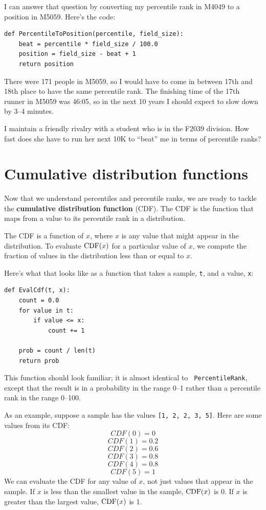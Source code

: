 \documentclass[12pt]{book}
\begin{document}
I can answer that question by converting my percentile rank in M4049
to a position in M5059.  Here's the code:

\begin{verbatim}
def PercentileToPosition(percentile, field_size):
    beat = percentile * field_size / 100.0
    position = field_size - beat + 1
    return position
\end{verbatim}

There were 171 people in M5059, so I would have to come in between
17th and 18th place to have the same percentile rank.  The finishing
time of the 17th runner in M5059 was 46:05, so in the next 10 years I
should expect to slow down by 3--4 minutes.

I maintain a friendly rivalry with a student who is in the
F2039 division.  How fast does she have to run her next 10K to
``beat'' me in terms of percentile ranks?


\section{Cumulative distribution functions}

Now that we understand percentiles and percentile ranks,
we are ready to tackle the {\bf cumulative distribution function}
(CDF).  The CDF is the function that maps from a value to its
percentile rank in a distribution.

The CDF is a function of $x$, where $x$ is any value that might appear
in the distribution.  To evaluate $\mathrm{CDF}(x)$ for a particular value of
$x$, we compute the fraction of values in the distribution less
than or equal to $x$.

Here's what that looks like as a function that takes a sample,
{\tt t}, and a value, {\tt x}:
%
\begin{verbatim}
def EvalCdf(t, x):
    count = 0.0
    for value in t:
        if value <= x:
            count += 1

    prob = count / len(t)
    return prob
\end{verbatim}

This function should look familiar; it is almost identical to {\tt
  PercentileRank}, except that the result is in a probability in the
range 0--1 rather than a percentile rank in the range 0--100.

As an example, suppose a sample has the values {\tt [1, 2, 2, 3, 5]}.
Here are some values from its CDF:
%
\[ CDF(0) = 0 \]
%
\[ CDF(1) = 0.2\]
%
\[ CDF(2) = 0.6\]
%
\[ CDF(3) = 0.8\]
%
\[ CDF(4) = 0.8\]
%
\[ CDF(5) = 1\]
%
We can evaluate the CDF for any value of $x$, not just
values that appear in the sample.
If $x$ is less than the smallest value in the sample, $\mathrm{CDF}(x)$ is 0.
If $x$ is greater than the largest value, $\mathrm{CDF}(x)$ is 1.
\end{document}
